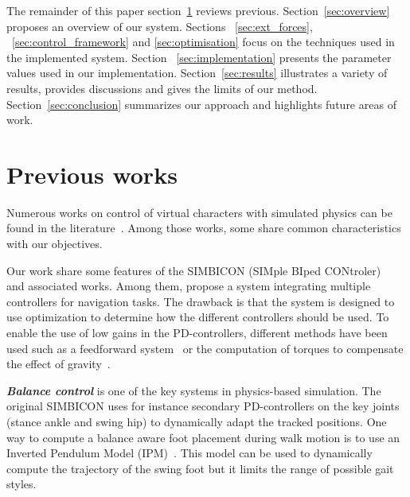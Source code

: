 \documentclass[conference]{acmsiggraph}
\begin{document}
The remainder of this paper section~\ref{sec:previous_works} reviews previous.
Section~\ref{sec:overview} proposes an overview of our system. Sections ~\ref{sec:ext_forces}, ~\ref{sec:control_framework} and \ref{sec:optimisation} focus on the techniques used in the implemented system. Section ~\ref{sec:implementation} presents the parameter values used in our implementation. Section~\ref{sec:results} illustrates a variety of results, provides discussions and gives the limits of our method. Section~\ref{sec:conclusion} summarizes our approach and highlights future areas of work.
 
\section{Previous works}
\label{sec:previous_works}

Numerous works on control of virtual characters with simulated physics can be found in the literature~\cite{geijtenbeek2012interactive}. Among those works, some share common characteristics with our objectives.

Our work share some features of the SIMBICON (SIMple BIped CONtroler)~\cite{yin2007simbicon} and associated works. Among them, \cite{coros2009robust} propose a system integrating multiple controllers for navigation tasks. The drawback is that the system is designed to use optimization to determine how the different controllers should be used. To enable the use of low gains in the PD-controllers, different methods have been used such as a feedforward system~\cite{yin2007simbicon} or the computation of torques to compensate the effect of gravity~\cite{coros2010generalized}.

\textbf{\textit{Balance control}} is one of the key systems in physics-based simulation. The original SIMBICON uses for instance secondary PD-controllers on the key joints (stance ankle and swing hip) to dynamically adapt the tracked positions. One way to compute a balance aware foot placement during walk motion is to use an Inverted Pendulum Model (IPM)~\cite{coros2010generalized,kajita20013d}. This model can be used to dynamically compute the trajectory of the swing foot but it limits the range of possible gait styles.
\end{document}
